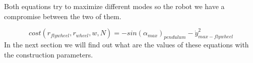Both equations try to maximize different modes so the robot we have a compromise between the two of them. 

\begin{equation}
	cost(r_{flywheel},r_{wheel},w,N) = - sin(\alpha_{max})_{pendulum} -\dot{y}^2_{max-flywheel}
	\label{eq: cost}
\end{equation}
In the next section we will find out what are the values 
of these equations with the construction parameters. 
